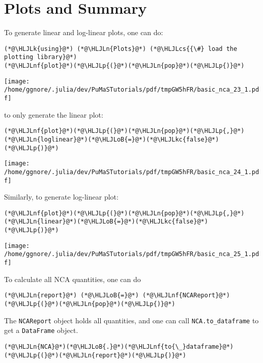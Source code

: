 \documentclass[12pt,a4paper]{article}
\newcommand{\HLJLk}[1]{\textcolor[RGB]{148,91,176}{\textbf{#1}}}
\newcommand{\HLJLkc}[1]{\textcolor[RGB]{59,151,46}{\textit{#1}}}
\newcommand{\HLJLn}[1]{#1}
\newcommand{\HLJLnf}[1]{\textcolor[RGB]{66,102,213}{#1}}
\newcommand{\HLJLoB}[1]{\textcolor[RGB]{102,102,102}{\textbf{#1}}}
\newcommand{\HLJLp}[1]{#1}
\newcommand{\HLJLcs}[1]{\textcolor[RGB]{153,153,119}{\textit{#1}}}
\begin{document}
\section{Plots and Summary}
To generate linear and log-linear plots, one can do:


\begin{lstlisting}
(*@\HLJLk{using}@*) (*@\HLJLn{Plots}@*) (*@\HLJLcs{{\#} load the plotting library}@*)
(*@\HLJLnf{plot}@*)(*@\HLJLp{(}@*)(*@\HLJLn{pop}@*)(*@\HLJLp{)}@*)
\end{lstlisting}

\texttt{[image: /home/ggnore/.julia/dev/PuMaSTutorials/pdf/tmpGW5hFR/basic\_nca\_23\_1.pdf]}

to only generate the linear plot:


\begin{lstlisting}
(*@\HLJLnf{plot}@*)(*@\HLJLp{(}@*)(*@\HLJLn{pop}@*)(*@\HLJLp{,}@*) (*@\HLJLn{loglinear}@*)(*@\HLJLoB{=}@*)(*@\HLJLkc{false}@*)(*@\HLJLp{)}@*)
\end{lstlisting}

\texttt{[image: /home/ggnore/.julia/dev/PuMaSTutorials/pdf/tmpGW5hFR/basic\_nca\_24\_1.pdf]}

Similarly, to generate log-linear plot:


\begin{lstlisting}
(*@\HLJLnf{plot}@*)(*@\HLJLp{(}@*)(*@\HLJLn{pop}@*)(*@\HLJLp{,}@*) (*@\HLJLn{linear}@*)(*@\HLJLoB{=}@*)(*@\HLJLkc{false}@*)(*@\HLJLp{)}@*)
\end{lstlisting}

\texttt{[image: /home/ggnore/.julia/dev/PuMaSTutorials/pdf/tmpGW5hFR/basic\_nca\_25\_1.pdf]}

To calculate all NCA quantities, one can do


\begin{lstlisting}
(*@\HLJLn{report}@*) (*@\HLJLoB{=}@*) (*@\HLJLnf{NCAReport}@*)(*@\HLJLp{(}@*)(*@\HLJLn{pop}@*)(*@\HLJLp{)}@*)
\end{lstlisting}


The \texttt{NCAReport} object holds all quantities, and one can call \texttt{NCA.to\_dataframe} to get a \texttt{DataFrame} object.


\begin{lstlisting}
(*@\HLJLn{NCA}@*)(*@\HLJLoB{.}@*)(*@\HLJLnf{to{\_}dataframe}@*)(*@\HLJLp{(}@*)(*@\HLJLn{report}@*)(*@\HLJLp{)}@*)
\end{lstlisting}
\end{document}
